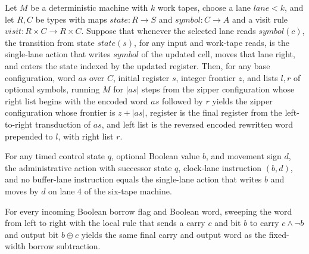 \begin{lemma}
\label{Turing.timed_lane_run}
\leanok
{}
Let $M$ be a deterministic machine with $k$ work tapes, choose a lane $lane<k$, and let
$R,C$ be types with maps $state:R\to S$ and $symbol:C\to A$ and a visit rule
$visit:R\times C\to R\times C$. Suppose that whenever the selected lane reads
$symbol(c)$, the transition from state $state(s)$, for any input and work-tape reads, is
the single-lane action that writes $symbol$ of the updated cell, moves that lane right,
and enters the state indexed by the updated register. Then, for any base configuration,
word $as$ over $C$, initial register $s$, integer frontier $z$, and lists $l,r$ of
optional symbols, running $M$ for $|as|$ steps from the zipper configuration whose right
list begins with the encoded word $as$ followed by $r$ yields the zipper configuration
whose frontier is $z+|as|$, register is the final register from the left-to-right
transduction of $as$, and left list is the reversed encoded rewritten word prepended to
$l$, with right list $r$.
\end{lemma}

\begin{lemma}
\label{Turing.timedAdmin_clock}
\leanok
{}
For any timed control state $q$, optional Boolean value $b$, and movement sign $d$, the
administrative action with successor state $q$, clock-lane instruction $(b,d)$, and no
buffer-lane instruction equals the single-lane action that writes $b$ and moves by $d$
on lane $4$ of the six-tape machine.
\end{lemma}

\begin{lemma}
\label{Turing.timedBorrow_fold}
\leanok
{}
For every incoming Boolean borrow flag and Boolean word, sweeping the word from left to
right with the local rule that sends a carry $c$ and bit $b$ to carry $c \wedge \lnot b$
and output bit $b \oplus c$ yields the same final carry and output word as the
fixed-width borrow subtraction.
\end{lemma}

